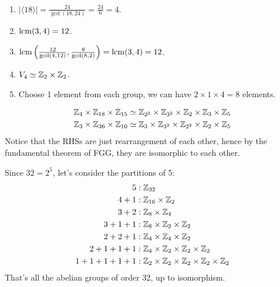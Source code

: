 \documentclass[12pt]{article}
\begin{document}
\begin{problem}[11.14]
~\begin{enumerate}[label=\alph*)]
	\item $ |\langle 18 \rangle|= \frac{24}{ \gcd ( 18,24) } = \frac{24}{6} =4$.
	\item $ \operatorname{lcm} ( 3,4)=12 $.
	\item $ \operatorname{lcm} \left( \frac{12}{ \gcd ( 4,12) }, \frac{8}{ \gcd ( 8,2) } \right) = \operatorname{lcm} ( 3,4) =12   $.
	\item $ V_4 \simeq \mathbb{Z}_2 \times \mathbb{Z}_2$.
	\item Choose 1 element from each group, we can have $ 2 \times 1 \times 4 = 8$ elements.
\end{enumerate}
\end{problem}
 \begin{problem}[11.20]
 \begin{align*}
	 \mathbb{Z}_4 \times \mathbb{Z}_{18} \times \mathbb{Z}_{15} &\simeq \mathbb{Z}_{2^2} \times \mathbb{Z}_{3^2} \times \mathbb{Z}_2 \times  \mathbb{Z}_3 \times \mathbb{Z}_5\\
	 \mathbb{Z}_3 \times \mathbb{Z}_{36} \times \mathbb{Z}_{10} &\simeq \mathbb{Z}_3 \times \mathbb{Z}_{3^2} \times \mathbb{Z}_{2^2} \times \mathbb{Z}_2 \times \mathbb{Z}_5
 \end{align*}
 Notice that the RHSs are just rearrangement of each other, hence by the fundamental theorem of FGG, they are isomorphic to each other.
 \end{problem}

\begin{problem}[11.23]
Since $ 32= 2^{5}$, let's consider the partitions of 5:
\begin{align*}
	5 &: \mathbb{Z}_{32}\\
	4+1&: \mathbb{Z}_{16} \times \mathbb{Z}_2\\
	3+2&: \mathbb{Z}_{8} \times \mathbb{Z}_4\\
	3+1+1&: \mathbb{Z}_8 \times \mathbb{Z}_2 \times \mathbb{Z}_2\\
	2+2+1&: \mathbb{Z}_4 \times \mathbb{Z}_4 \times \mathbb{Z}_2\\
	2+1+1+1 &: \mathbb{Z}_4 \times \mathbb{Z}_2 \times \mathbb{Z}_2 \times \mathbb{Z}_2\\
	1+1+1+1+1 &: \mathbb{Z}_2 \times \mathbb{Z}_2 \times \mathbb{Z}_2 \times \mathbb{Z}_2 \times \mathbb{Z}_2
\end{align*}
That's all the abelian groups of order 32, up to isomorphism.
\end{problem}
\end{document}
